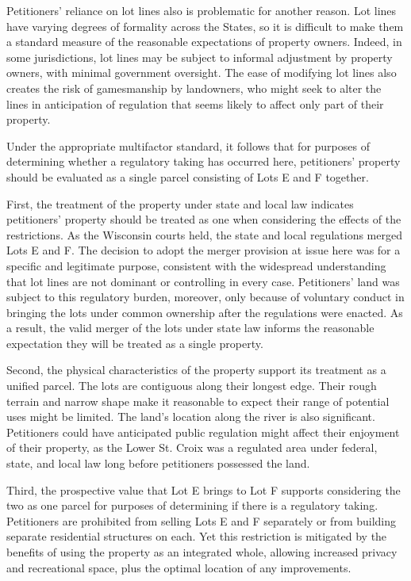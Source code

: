 Petitioners' reliance on lot lines also is problematic for another reason. Lot
lines have varying degrees of formality across the States, so it is difficult to
make them a standard measure of the reasonable expectations of property owners.
Indeed, in some jurisdictions, lot lines may be subject to informal adjustment
by property owners, with minimal government oversight. The ease of modifying lot
lines also creates the risk of gamesmanship by landowners, who might seek to
alter the lines in anticipation of regulation that seems likely to affect only
part of their property.



Under the appropriate multifactor standard, it follows that for purposes of
determining whether a regulatory taking has occurred here, petitioners' property
should be evaluated as a single parcel consisting of Lots E and F together.

First, the treatment of the property under state and local law indicates
petitioners' property should be treated as one when considering the effects of
the restrictions. As the Wisconsin courts held, the state and local regulations
merged Lots E and F. The decision to adopt the merger provision at issue here
was for a specific and legitimate purpose, consistent with the widespread
understanding that lot lines are not dominant or controlling in every case.
Petitioners' land was subject to this regulatory burden, moreover, only because
of voluntary conduct in bringing the lots under common ownership after the
regulations were enacted. As a result, the valid merger of the lots under state
law informs the reasonable expectation they will be treated as a single
property.

Second, the physical characteristics of the property support its treatment as a
unified parcel. The lots are contiguous along their longest edge. Their rough
terrain and narrow shape make it reasonable to expect their range of potential
uses might be limited. The land's location along the river is also significant.
Petitioners could have anticipated public regulation might affect their
enjoyment of their property, as the Lower St. Croix was a regulated area under
federal, state, and local law long before petitioners possessed the land.

Third, the prospective value that Lot E brings to Lot F supports considering the
two as one parcel for purposes of determining if there is a regulatory taking.
Petitioners are prohibited from selling Lots E and F separately or from building
separate residential structures on each. Yet this restriction is mitigated by
the benefits of using the property as an integrated whole, allowing increased
privacy and recreational space, plus the optimal location of any improvements. 

